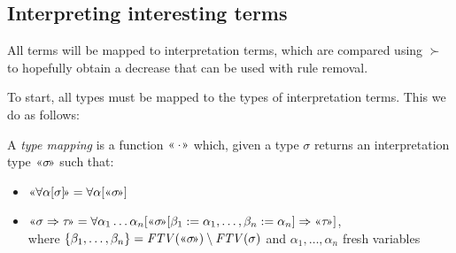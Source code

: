 \documentclass[runningheads,a4paper]{llncs}
\newcommand{\quant}[2]{\forall #1[#2]}
\newcommand{\typeinterpret}[1]{\text{\guillemotleft} #1\! \text{\guillemotright}}
\newcommand{\arrtype}{\Rightarrow}
\newcommand{\FTV}{\mathit{FTV}}
\begin{document}
\subsection{Interpreting interesting terms}

All terms will be mapped to interpretation terms, which are compared
using $\succ$ to hopefully obtain a decrease that can be used with
rule removal.

To start, all types must be mapped to the types of interpretation
terms.  This we do as follows:

\begin{definition}
A \emph{type mapping} is a function $\typeinterpret{\cdot}$ which,
given a type $\sigma$ returns an interpretation type $\typeinterpret{
\sigma}$ such that:
\begin{itemize}
\item $\typeinterpret{\quant{\alpha}{\sigma}} =
  \quant{\alpha}{\typeinterpret{\sigma}}$
\item $\typeinterpret{\sigma \arrtype \tau} =
  \quant{\alpha_1 \dots \alpha_n}{\typeinterpret{\sigma}[\beta_1:=
  \alpha_1,\dots,\beta_n:=\alpha_n] \arrtype
  \typeinterpret{\tau}}$, \\
  where $\{\beta_1,\dots,\beta_n\} = \FTV(\typeinterpret{\sigma})
  \setminus \FTV(\sigma)$ and $\alpha_1,\dots,\alpha_n$ fresh
  variables
\end{itemize}


\end{definition}
\end{document}
